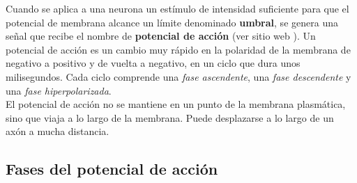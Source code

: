 Cuando se aplica a una neurona un estímulo de intensidad suficiente para que el potencial de membrana alcance un límite denominado \textbf{umbral}, se genera una señal que recibe el nombre de \textbf{potencial de acción} (ver sitio web \cite{khanacademywebsite}).
Un potencial de acción es un cambio muy rápido en la polaridad de la membrana de negativo a positivo y de vuelta a negativo, en un ciclo que dura unos milisegundos. Cada ciclo comprende una \textit{fase ascendente}, una\textit{ fase descendente} y una \textit{fase hiperpolarizada}.\\
El potencial de acción no se mantiene en un punto de la membrana plasmática, sino que viaja a lo largo de la membrana. Puede desplazarse a lo largo de un axón a mucha distancia.
\newpage
\subsection{Fases del potencial de acción}\label{subsec:fases_potencial_accion}
